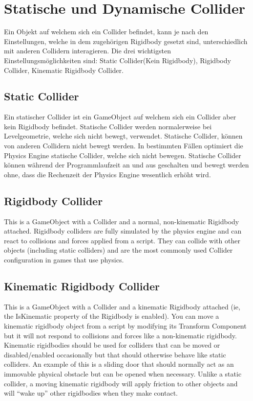 \section{Statische und Dynamische Collider}
Ein Objekt auf welchem sich ein Collider befindet, kann je nach den Einstellungen, welche in dem zugehörigen Rigidbody gesetzt sind, unterschiedlich mit anderen Collidern interagieren. Die drei wichtigsten Einstellungsmöglichkeiten sind: Static Collider(Kein Rigidbody), Rigidbody Collider, Kinematic Rigidbody Collider.

\subsection{Static Collider}
Ein statischer Collider ist ein GameObject auf welchem sich ein Collider aber kein Rigidbody befindet. Statische Collider werden normalerweise bei Levelgeometrie, welche sich nicht bewegt, verwendet. Statische Collider, können von anderen Collidern nicht bewegt werden. In bestimmten Fällen optimiert die Physics Engine statische Collider, welche sich nicht bewegen. Statische Collider können während der Programmlaufzeit an und aus geschalten und bewegt werden ohne, dass die Rechenzeit der Physics Engine wesentlich erhöht wird.

\subsection{Rigidbody Collider}
This is a GameObject with a Collider and a normal, non-kinematic Rigidbody attached. Rigidbody colliders are fully simulated by the physics engine and can react to collisions and forces applied from a script. They can collide with other objects (including static colliders) and are the most commonly used Collider configuration in games that use physics.

\subsection{Kinematic Rigidbody Collider}
This is a GameObject with a Collider and a kinematic Rigidbody attached (ie, the IsKinematic property of the Rigidbody is enabled). You can move a kinematic rigidbody object from a script by modifying its Transform Component
but it will not respond to collisions and forces like a non-kinematic rigidbody. Kinematic rigidbodies should be used for colliders that can be moved or disabled/enabled occasionally but that should otherwise behave like static colliders. An example of this is a sliding door that should normally act as an immovable physical obstacle but can be opened when necessary. Unlike a static collider, a moving kinematic rigidbody will apply friction to other objects and will “wake up” other rigidbodies when they make contact.

